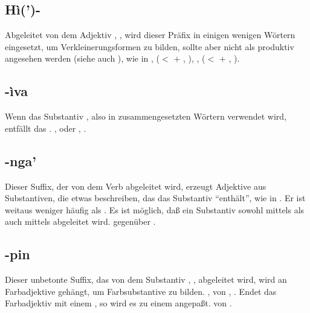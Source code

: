 \subsection{H\`i(’)-} Abgeleitet von dem Adjektiv , , wird dieser
Pr\"afix in einigen wenigen W\"ortern eingesetzt, um Verkleinerungsformen zu bilden,
sollte aber nicht als produktiv angesehen werden (siehe auch ),
wie in ,  ($<$  $+$ ,
), ,  ($<$  $+$
, ).

\subsection{-\`iva} Wenn das Substantiv , also 
in zusammengesetzten W\"ortern verwendet wird, entf\"allt das . ,
 oder , .

\subsection{-nga’} Dieser Suffix, der von dem Verb  abgeleitet wird, erzeugt
Adjektive aus Substantiven, die etwas beschreiben, das das Substantiv "`enth\"alt"',
wie in  . Er ist weitaus weniger h\"aufig als .
Es ist m\"oglich, da\ss{} ein Substantiv sowohl mittels  als
auch mittels  abgeleitet wird.   gegen\"uber
 .

\subsection{-pin} Dieser unbetonte Suffix, das von dem Substantiv , ,
abgeleitet wird, wird an Farbadjektive geh\"angt, um Farbsubstantive zu bilden.
,  von , .
Endet das Farbadjektiv mit einem , so wird es zu einem  angepa\ss{}t.
 von .


